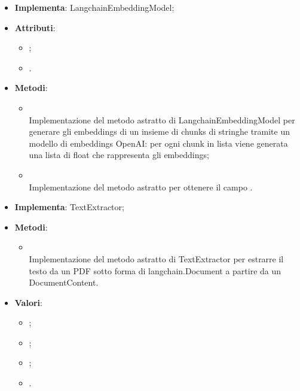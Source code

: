 \documentclass[10pt, a4paper]{article}
\begin{document}
\label{OpenAIEmbeddingModelDettaglio}
\begin{itemize}
    \item \textbf{Implementa}: LangchainEmbeddingModel;
    \item \textbf{Attributi}:
    \begin{itemize}
        \item {};
        \item {}.
    \end{itemize}
    \item \textbf{Metodi}:
    \begin{itemize}
        \item {}\\
        Implementazione del metodo astratto di LangchainEmbeddingModel per generare gli embeddings di un insieme di chunks di stringhe tramite un modello di embeddings OpenAI: per ogni chunk in lista viene generata una lista di float che rappresenta gli embeddings;
        \item {}\\
        Implementazione del metodo astratto per ottenere il campo .
    \end{itemize}
\end{itemize}

\label{PDFTextExtractorDettaglio}
\begin{itemize}
    \item \textbf{Implementa}: TextExtractor;
    \item \textbf{Metodi}:
    \begin{itemize}
        \item {}\\
        Implementazione del metodo astratto di TextExtractor per estrarre il testo da un PDF sotto forma di langchain.Document a partire da un DocumentContent.
    \end{itemize}
\end{itemize}



\label{StatusDettaglio}
\begin{itemize}
    \item \textbf{Valori}:
    \begin{itemize}
        \item {};
        \item {};
        \item {};
        \item {}.
    \end{itemize}
\end{itemize}
\end{document}
